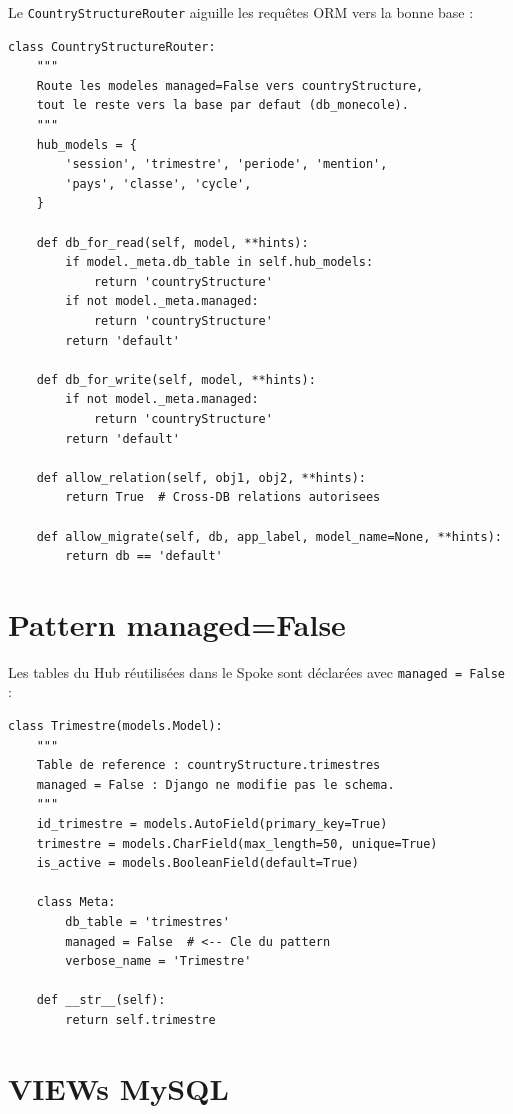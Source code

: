 \documentclass[12pt,a4paper,oneside]{report}
\begin{document}
Le \texttt{CountryStructureRouter} aiguille les requêtes ORM vers la bonne base :

\begin{lstlisting}[style=python, title=db\_routers.py]
class CountryStructureRouter:
    """
    Route les modeles managed=False vers countryStructure,
    tout le reste vers la base par defaut (db_monecole).
    """
    hub_models = {
        'session', 'trimestre', 'periode', 'mention',
        'pays', 'classe', 'cycle',
    }
    
    def db_for_read(self, model, **hints):
        if model._meta.db_table in self.hub_models:
            return 'countryStructure'
        if not model._meta.managed:
            return 'countryStructure'
        return 'default'
    
    def db_for_write(self, model, **hints):
        if not model._meta.managed:
            return 'countryStructure'
        return 'default'
    
    def allow_relation(self, obj1, obj2, **hints):
        return True  # Cross-DB relations autorisees
    
    def allow_migrate(self, db, app_label, model_name=None, **hints):
        return db == 'default'
\end{lstlisting}

\section{Pattern managed=False}

Les tables du Hub réutilisées dans le Spoke sont déclarées avec \texttt{managed = False} :

\begin{lstlisting}[style=python, title=MonEcole models/country\_structure.py]
class Trimestre(models.Model):
    """
    Table de reference : countryStructure.trimestres
    managed = False : Django ne modifie pas le schema.
    """
    id_trimestre = models.AutoField(primary_key=True)
    trimestre = models.CharField(max_length=50, unique=True)
    is_active = models.BooleanField(default=True)
    
    class Meta:
        db_table = 'trimestres'
        managed = False  # <-- Cle du pattern
        verbose_name = 'Trimestre'
    
    def __str__(self):
        return self.trimestre
\end{lstlisting}

\section{VIEWs MySQL}
\end{document}
